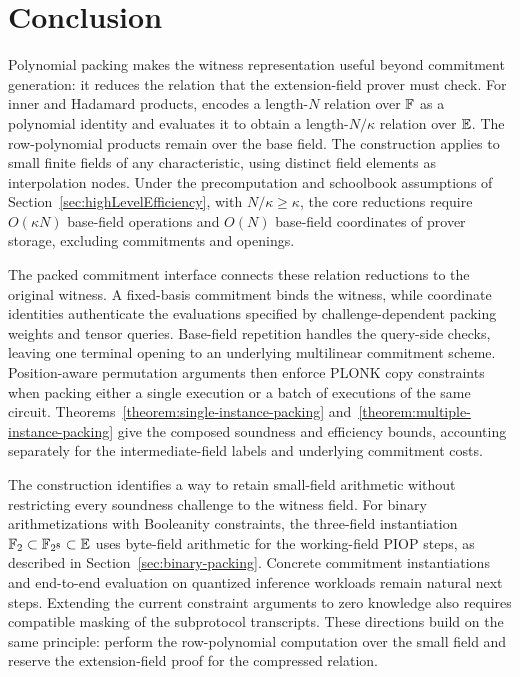 \section{Conclusion}
\label{sec:conclusion}

Polynomial packing makes the witness representation useful beyond
commitment generation: it reduces the relation that the
extension-field prover must check.
For inner and Hadamard products, \methodname encodes a length-\(N\)
relation over \({\mathbb{F}}\) as a polynomial identity and evaluates it
to obtain a length-\(N/\kappa\) relation over \(\mathbb{E}\).
The row-polynomial products remain over the base field.
The construction applies to small finite fields of any
characteristic, using distinct field elements as interpolation
nodes.
Under the precomputation and schoolbook assumptions of
Section~\ref{sec:highLevelEfficiency}, with \(N/\kappa\geq\kappa\),
the core reductions require \(O(\kappa N)\) base-field operations
and \(O(N)\) base-field coordinates of prover storage, excluding
commitments and openings.

The packed commitment interface connects these relation reductions
to the original witness. A fixed-basis commitment binds the witness,
while coordinate identities authenticate the evaluations specified
by challenge-dependent packing weights and tensor queries.
Base-field repetition handles the query-side checks, leaving one
terminal opening to an underlying multilinear commitment scheme.
Position-aware permutation arguments then enforce PLONK copy
constraints when packing either a single execution or a batch of
executions of the same circuit.
Theorems~\ref{theorem:single-instance-packing}
and~\ref{theorem:multiple-instance-packing} give the composed
soundness and efficiency bounds, accounting separately for the
intermediate-field labels and underlying commitment costs.

The construction identifies a way to retain small-field arithmetic
without restricting every soundness challenge to the witness field.
For binary arithmetizations with Booleanity constraints, the
three-field instantiation
\(\mathbb F_2\subset\mathbb F_{2^8}\subset\mathbb{E}\)
uses byte-field arithmetic for the working-field PIOP steps,
as described in Section~\ref{sec:binary-packing}.
Concrete commitment instantiations and end-to-end evaluation on
quantized inference workloads remain natural next steps.
Extending the current constraint arguments to zero knowledge also
requires compatible masking of the subprotocol transcripts.
These directions build on the same principle: perform the
row-polynomial computation over the small field and reserve the
extension-field proof for the compressed relation.
